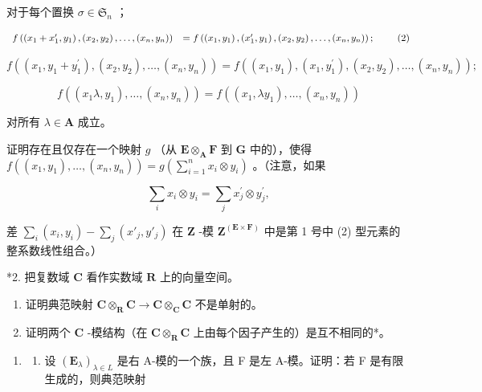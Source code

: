 对于每个置换 \(\sigma \in \mathfrak{S}_n\) ；

\[
\begin{array}{r l} f \left(\left(x _ {1} + x _ {1} ^ {\prime}, y _ {1}\right), \left(x _ {2}, y _ {2}\right), \dots , \left(x _ {n}, y _ {n}\right)\right) & = f \left(\left(x _ {1}, y _ {1}\right), \left(x _ {1} ^ {\prime}, y _ {1}\right), \left(x _ {2}, y _ {2}\right), \dots , \left(x _ {n}, y _ {n}\right)\right); \end{array} \tag {2}
\]

\[
f ((x _ {1}, y _ {1} + y _ {1} ^ {\prime}), (x _ {2}, y _ {2}), \dots , (x _ {n}, y _ {n})) = f ((x _ {1}, y _ {1}), (x _ {1}, y _ {1} ^ {\prime}), (x _ {2}, y _ {2}), \dots , (x _ {n}, y _ {n}));\tag{3}
\]

\[
f ((x _ {1} \lambda , y _ {1}), \dots , (x _ {n}, y _ {n})) = f ((x _ {1}, \lambda y _ {1}), \dots , (x _ {n}, y _ {n}))\tag{4}
\]

对所有 \(\lambda \in \mathbf{A}\) 成立。

证明存在且仅存在一个映射 \(g\) （从 \(\mathbf{E} \otimes_{\mathbf{A}} \mathbf{F}\) 到 \(\mathbf{G}\) 中的），使得 \(f((x_1, y_1), \ldots, (x_n, y_n)) = g\left(\sum_{i=1}^{n} x_i \otimes y_i\right)\) 。（注意，如果

\[
\sum_ {i} x _ {i} \otimes y _ {i} = \sum_ {j} x _ {j} ^ {\prime} \otimes y _ {j} ^ {\prime},
\]

差 \(\sum_{i}(x_i, y_i) - \sum_j(x'_j, y'_j)\) 在 \(\mathbf{Z}\) -模 \(\mathbf{Z}^{(\mathbf{E} \times \mathbf{F})}\) 中是第 1 号中 (2) 型元素的整系数线性组合。）

*2. 把复数域 \(\mathbf{C}\) 看作实数域 \(\mathbf{R}\) 上的向量空间。

\begin{enumerate}
\def\labelenumi{(\alph{enumi})}
\item
  证明典范映射 \(\mathbf{C} \otimes_{\mathbf{R}} \mathbf{C} \to \mathbf{C} \otimes_{\mathbf{C}} \mathbf{C}\) 不是单射的。
\item
  证明两个 \(\mathbf{C}\) -模结构（在 \(\mathbf{C} \otimes_{\mathbf{R}} \mathbf{C}\) 上由每个因子产生的）是互不相同的*。
\end{enumerate}

\begin{enumerate}
\def\labelenumi{\arabic{enumi}.}
\setcounter{enumi}{2}
\tightlist
\item
  \begin{enumerate}
  \def\labelenumii{(\alph{enumii})}
  \tightlist
  \item
    设 \((\mathbf{E}_{\lambda})_{\lambda \in L}\) 是右 A-模的一个族，且 F 是左 A-模。证明：若 F 是有限生成的，则典范映射
  \end{enumerate}
\end{enumerate}

